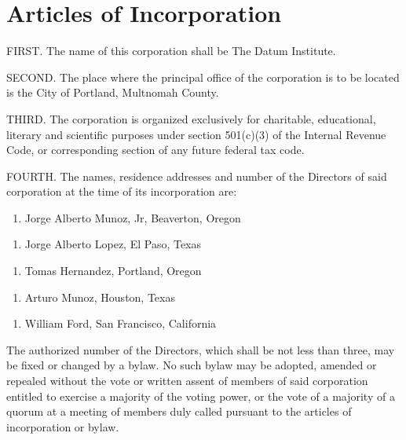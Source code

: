 \section{Articles of Incorporation}

FIRST. The name of this corporation shall be The Datum Institute.

SECOND. The place where the principal office of the corporation is to be located is the City of Portland, Multnomah County.

THIRD. The corporation is organized exclusively for charitable, educational, literary and scientific purposes under section 501(c)(3) of the Internal Revenue Code, or corresponding section of any future federal tax code. 

FOURTH. The names, residence addresses and number of the Directors of said corporation at the time of its incorporation are:

\begin{enumerate}
\item Jorge Alberto Munoz, Jr, Beaverton, Oregon
\end{enumerate}
\begin{enumerate}
\item Jorge Alberto Lopez, El Paso, Texas
\end{enumerate}
\begin{enumerate}
\item Tomas Hernandez, Portland, Oregon
\end{enumerate}
\begin{enumerate}
\item Arturo Munoz, Houston, Texas
\end{enumerate}
\begin{enumerate}
\item William Ford, San Francisco, California
\end{enumerate}

The authorized number of the Directors, which shall be not less than three, may be fixed or changed by a bylaw.  No such bylaw may be adopted, amended or repealed without the vote or written assent of members of said corporation entitled to exercise a majority of the voting power, or the vote of a majority of a quorum at a meeting of members duly called pursuant to the articles of incorporation or bylaw.